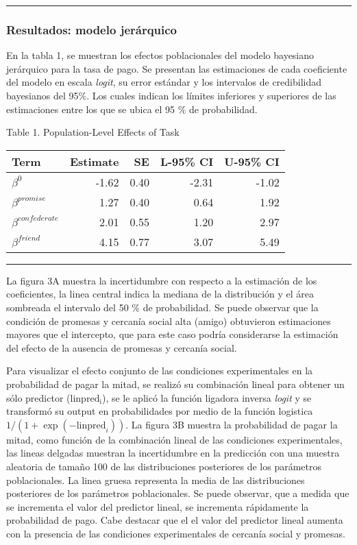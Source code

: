 \documentclass[12pt,]{article}
\begin{document}
\begin{center}\rule{0.5\linewidth}{\linethickness}\end{center}

\subsubsection{Resultados: modelo
jerárquico}\label{resultados-modelo-jerarquico}

En la tabla 1, se muestran los efectos poblacionales del modelo
bayesiano jerárquico para la tasa de pago. Se presentan las estimaciones
de cada coeficiente del modelo en escala \emph{logit}, su error estándar
y los intervalos de credibilidad bayesianos del 95\%. Los cuales indican
los límites inferiores y superiores de las estimaciones entre los que se
ubica el 95 \% de probabilidad.

Table 1. Population-Level Effects of Task

\begin{longtable}[]{@{}lrrrr@{}}
\toprule
Term & Estimate & SE & L-95\% CI & U-95\% CI\tabularnewline
\midrule
\endhead
\(\beta^0\) & -1.62 & 0.40 & -2.31 & -1.02\tabularnewline
\(\beta^{promise}\) & 1.27 & 0.40 & 0.64 & 1.92\tabularnewline
\(\beta^{confederate}\) & 2.01 & 0.55 & 1.20 & 2.97\tabularnewline
\(\beta^{friend}\) & 4.15 & 0.77 & 3.07 & 5.49\tabularnewline
\bottomrule
\end{longtable}

\begin{center}\rule{0.5\linewidth}{\linethickness}\end{center}

La figura 3A muestra la incertidumbre con respecto a la estimación de
los coeficientes, la linea central indica la mediana de la distribución
y el área sombreada el intervalo del 50 \% de probabilidad. Se puede
observar que la condición de promesas y cercanía social alta (amigo)
obtuvieron estimaciones mayores que el intercepto, que para este caso
podría considerarse la estimación del efecto de la ausencia de promesas
y cercanía social.

Para visualizar el efecto conjunto de las condiciones experimentales en
la probabilidad de pagar la mitad, se realizó su combinación lineal para
obtener un sólo predictor (\(\mathrm{linpred_i}\)), se le aplicó la
función ligadora inversa \emph{logit} y se transformó su output en
probabilidades por medio de la función logistica
\(1 / (1 + \exp(-\mathrm{linpred}_i))\). La figura 3B muestra la
probabilidad de pagar la mitad, como función de la combinación lineal de
las condiciones experimentales, las lineas delgadas muestran la
incertidumbre en la predicción con una muestra aleatoria de tamaño 100
de las distribuciones posteriores de los parámetros poblacionales. La
linea gruesa representa la media de las distribuciones posteriores de
los parámetros poblacionales. Se puede observar, que a medida que se
incrementa el valor del predictor lineal, se incrementa rápidamente la
probabilidad de pago. Cabe destacar que el el valor del predictor lineal
aumenta con la presencia de las condiciones experimentales de cercanía
social y promesas.
\end{document}
